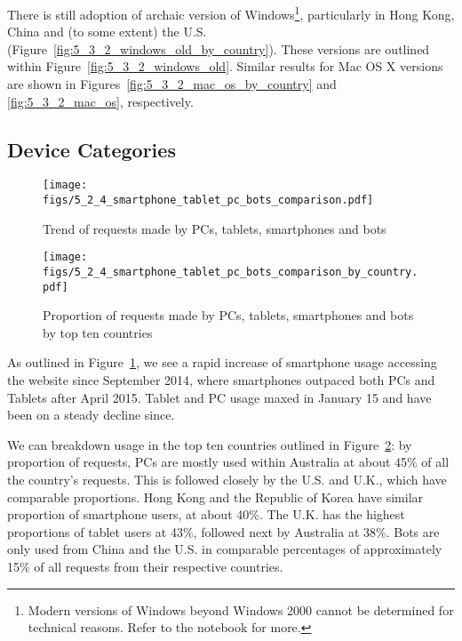 \documentclass[12pt,titlepage]{article}
\begin{document}
There is still adoption of archaic version of Windows\footnote{Modern versions of Windows beyond Windows 2000 cannot be determined for technical reasons. Refer to the notebook for more.}, particularly in Hong Kong, China and (to some extent) the U.S. (Figure~\ref{fig:5_3_2_windows_old_by_country}). These versions are outlined within Figure~\ref{fig:5_3_2_windows_old}. Similar results for Mac OS X versions are shown in Figures~\ref{fig:5_3_2_mac_os_by_country} and \ref{fig:5_3_2_mac_os}, respectively.

\subsection{Device Categories}
\label{ssub:device_cat}
\begin{figure}[thbp]
  \centering
  \texttt{[image: figs/5\_2\_4\_smartphone\_tablet\_pc\_bots\_comparison.pdf]}
  \caption{Trend of requests made by PCs, tablets, smartphones and bots}
  \label{fig:5_2_4_smartphone_tablet_pc_bots_comparison}
\end{figure}

\begin{figure}[thbp]
  \centering
  \texttt{[image: figs/5\_2\_4\_smartphone\_tablet\_pc\_bots\_comparison\_by\_country.pdf]}
  \caption{Proportion of requests made by PCs, tablets, smartphones and bots by top ten countries}
  \label{fig:5_2_4_smartphone_tablet_pc_bots_comparison_by_country}
\end{figure}

As outlined in Figure~\ref{fig:5_2_4_smartphone_tablet_pc_bots_comparison}, we see a rapid increase of smartphone usage accessing the website since September 2014, where smartphones outpaced both PCs and Tablets after April 2015. Tablet and PC usage maxed in January 15 and have been on a steady decline since.

We can breakdown usage in the top ten countries outlined in Figure~\ref{fig:5_2_4_smartphone_tablet_pc_bots_comparison_by_country}: by proportion of requests, PCs are mostly used within Australia at about 45\% of all the country's requests. This is followed closely by the U.S. and U.K., which have comparable proportions. Hong Kong and the Republic of Korea have similar proportion of smartphone users, at about 40\%. The U.K. has the highest proportions of tablet users at 43\%, followed next by Australia at 38\%. Bots are only used from China and the U.S. in comparable percentages of approximately 15\% of all requests from their respective countries.
\end{document}
